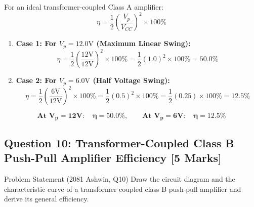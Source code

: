 \documentclass[11pt,a4paper,oneside]{book}
\begin{document}
For an ideal transformer-coupled Class A amplifier:
\[
\eta = \frac{1}{2} \left(\frac{V_p}{V_{CC}}\right)^2 \times 100\%
\]
\begin{enumerate}[leftmargin=1.5em]
  \item \textbf{Case 1: For $V_p = 12.0\text{V}$ (Maximum Linear Swing):}
  \[
  \eta = \frac{1}{2} \left(\frac{12\text{V}}{12\text{V}}\right)^2 \times 100\% = \frac{1}{2} (1.0)^2 \times 100\% = \mathbf{50.0\%}
  \]
  \item \textbf{Case 2: For $V_p = 6.0\text{V}$ (Half Voltage Swing):}
  \[
  \eta = \frac{1}{2} \left(\frac{6\text{V}}{12\text{V}}\right)^2 \times 100\% = \frac{1}{2} (0.5)^2 \times 100\% = \frac{1}{2} (0.25) \times 100\% = \mathbf{12.5\%}
  \]
\end{enumerate}

\begin{answerbox}
$$\mathbf{\text{At } V_p = 12\text{V}: \quad \eta = 50.0\%, \qquad \text{At } V_p = 6\text{V}: \quad \eta = 12.5\%}$$
\end{answerbox}

\vspace{0.6cm}

\subsection{Question 10: Transformer-Coupled Class B Push-Pull Amplifier Efficiency [5 Marks]}
\begin{questionbox}{Problem Statement (2081 Ashwin, Q10)}
Draw the circuit diagram and the characteristic curve of a transformer coupled class B push-pull amplifier and derive its general efficiency.
\end{questionbox}
\end{document}
